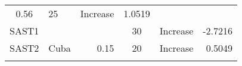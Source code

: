 \documentclass[]{article}
\begin{document}
\begin{longtable}[]{@{}clrccr@{}}
\begin{minipage}[t]{0.11\columnwidth}
0.56\strut
\end{minipage} & \begin{minipage}[t]{0.10\columnwidth}\centering\strut
25\strut
\end{minipage} & \begin{minipage}[t]{0.16\columnwidth}\centering\strut
Increase\strut
\end{minipage} & \begin{minipage}[t]{0.09\columnwidth}\raggedleft\strut
1.0519\strut
\end{minipage}\tabularnewline
\begin{minipage}[t]{0.08\columnwidth}\centering\strut
SAST1\strut
\end{minipage} & \begin{minipage}[t]{0.29\columnwidth}\raggedright\strut
\strut
\end{minipage} & \begin{minipage}[t]{0.11\columnwidth}\raggedleft\strut
\strut
\end{minipage} & \begin{minipage}[t]{0.10\columnwidth}\centering\strut
30\strut
\end{minipage} & \begin{minipage}[t]{0.16\columnwidth}\centering\strut
Increase\strut
\end{minipage} & \begin{minipage}[t]{0.09\columnwidth}\raggedleft\strut
-2.7216\strut
\end{minipage}\tabularnewline
\begin{minipage}[t]{0.08\columnwidth}\centering\strut
SAST2\strut
\end{minipage} & \begin{minipage}[t]{0.29\columnwidth}\raggedright\strut
Cuba\strut
\end{minipage} & \begin{minipage}[t]{0.11\columnwidth}\raggedleft\strut
0.15\strut
\end{minipage} & \begin{minipage}[t]{0.10\columnwidth}\centering\strut
20\strut
\end{minipage} & \begin{minipage}[t]{0.16\columnwidth}\centering\strut
Increase\strut
\end{minipage} & \begin{minipage}[t]{0.09\columnwidth}\raggedleft\strut
0.5049\strut
\end{minipage}\tabularnewline
\begin{minipage}[t]{0.08\columnwidth}\centering\strut

\end{minipage}
\end{longtable}
\end{document}
